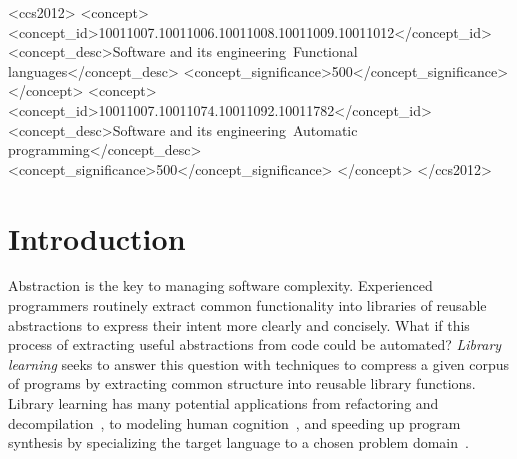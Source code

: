\documentclass[acmsmall,screen,nonacm,review=false,timestamp=false]{acmart}
\begin{document}
\begin{CCSXML}
  <ccs2012>
     <concept>
         <concept_id>10011007.10011006.10011008.10011009.10011012</concept_id>
         <concept_desc>Software and its engineering~Functional languages</concept_desc>
         <concept_significance>500</concept_significance>
     </concept>
     <concept>
         <concept_id>10011007.10011074.10011092.10011782</concept_id>
         <concept_desc>Software and its engineering~Automatic programming</concept_desc>
         <concept_significance>500</concept_significance>
      </concept>
   </ccs2012>
\end{CCSXML}
  
  

\maketitle



\section{Introduction}
\label{sec:intro}

Abstraction is the key to managing software complexity.
Experienced programmers routinely extract common functionality
into libraries of reusable abstractions
to express their intent more clearly and concisely.
What if this process of extracting useful abstractions from code could be automated?
\emph{Library learning} seeks to answer this question
  with techniques to compress
  a given corpus of programs
  by extracting common structure into reusable library functions.
Library learning
  has many potential applications
  from refactoring and decompilation~\cite{szalinski,shapemod},
  to modeling human cognition~\cite{cogsci-smiley,cogsci-dataset},
  and speeding up program synthesis by
  specializing the target language to
  a chosen problem domain~\cite{dreamcoder}.
\end{document}
